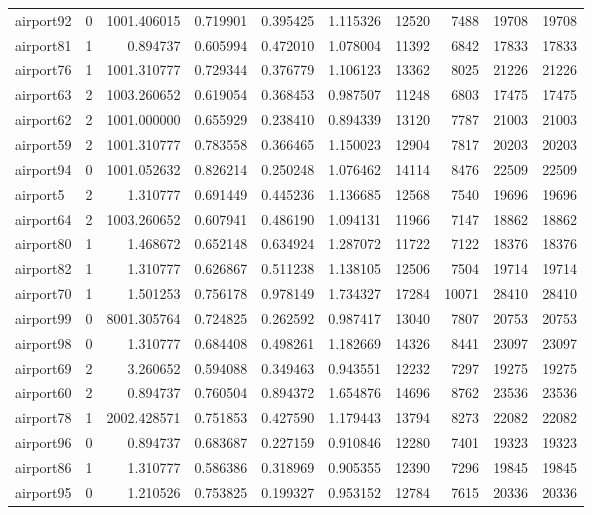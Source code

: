 \begin{longtable}{|l|r|r|r|r|r|r|r|r|r|}
airport92 & 0 & 1001.406015 & 0.719901 & 0.395425 & 1.115326 & 12520 & 7488 & 19708 & 19708 \\
airport81 & 1 & 0.894737 & 0.605994 & 0.472010 & 1.078004 & 11392 & 6842 & 17833 & 17833 \\
airport76 & 1 & 1001.310777 & 0.729344 & 0.376779 & 1.106123 & 13362 & 8025 & 21226 & 21226 \\
airport63 & 2 & 1003.260652 & 0.619054 & 0.368453 & 0.987507 & 11248 & 6803 & 17475 & 17475 \\
airport62 & 2 & 1001.000000 & 0.655929 & 0.238410 & 0.894339 & 13120 & 7787 & 21003 & 21003 \\
airport59 & 2 & 1001.310777 & 0.783558 & 0.366465 & 1.150023 & 12904 & 7817 & 20203 & 20203 \\
airport94 & 0 & 1001.052632 & 0.826214 & 0.250248 & 1.076462 & 14114 & 8476 & 22509 & 22509 \\
airport5 & 2 & 1.310777 & 0.691449 & 0.445236 & 1.136685 & 12568 & 7540 & 19696 & 19696 \\
airport64 & 2 & 1003.260652 & 0.607941 & 0.486190 & 1.094131 & 11966 & 7147 & 18862 & 18862 \\
airport80 & 1 & 1.468672 & 0.652148 & 0.634924 & 1.287072 & 11722 & 7122 & 18376 & 18376 \\
airport82 & 1 & 1.310777 & 0.626867 & 0.511238 & 1.138105 & 12506 & 7504 & 19714 & 19714 \\
airport70 & 1 & 1.501253 & 0.756178 & 0.978149 & 1.734327 & 17284 & 10071 & 28410 & 28410 \\
airport99 & 0 & 8001.305764 & 0.724825 & 0.262592 & 0.987417 & 13040 & 7807 & 20753 & 20753 \\
airport98 & 0 & 1.310777 & 0.684408 & 0.498261 & 1.182669 & 14326 & 8441 & 23097 & 23097 \\
airport69 & 2 & 3.260652 & 0.594088 & 0.349463 & 0.943551 & 12232 & 7297 & 19275 & 19275 \\
airport60 & 2 & 0.894737 & 0.760504 & 0.894372 & 1.654876 & 14696 & 8762 & 23536 & 23536 \\
airport78 & 1 & 2002.428571 & 0.751853 & 0.427590 & 1.179443 & 13794 & 8273 & 22082 & 22082 \\
airport96 & 0 & 0.894737 & 0.683687 & 0.227159 & 0.910846 & 12280 & 7401 & 19323 & 19323 \\
airport86 & 1 & 1.310777 & 0.586386 & 0.318969 & 0.905355 & 12390 & 7296 & 19845 & 19845 \\
airport95 & 0 & 1.210526 & 0.753825 & 0.199327 & 0.953152 & 12784 & 7615 & 20336 & 20336 \\

\end{longtable}
